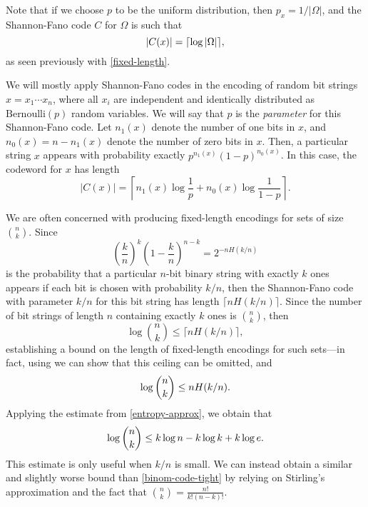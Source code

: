 Note that if we choose $p$ to be the uniform distribution, then
$p_x = 1/|\Omega|$, and the Shannon-Fano code $C$ for $\Omega$ is such
that
\[
|C(x)| = {\lceil \log |\Omega| \rceil},
\]
as seen previously with \eqref{fixed-length}.

We will mostly apply Shannon-Fano codes in the encoding of random bit
strings $x = x_1 \cdots x_n$, where all $x_i$ are independent and
identically distributed as $\text{Bernoulli}(p)$ random variables. We
will say that $p$ is the \emph{parameter} for this Shannon-Fano
code. Let $n_1(x)$ denote the number of one bits in $x$, and $n_0(x) =
n - n_1(x)$ denote the number of zero bits in $x$. Then, a particular
string $x$ appears with probability exactly $p^{n_1(x)} (1 -
p)^{n_0(x)}$. In this case, the codeword for $x$ has length
\[|C(x)| = \left\lceil n_1(x) \log \frac{1}{p} + n_0(x) \log
  \frac{1}{1 - p} \right\rceil.\]

\begin{exm}
  We are often concerned with producing fixed-length encodings for
  sets of size ${n \choose k}$. Since
  \[
  \left(\frac{k}{n}\right)^k \left(1 - \frac{k}{n}\right)^{n - k} =
  2^{-n H(k/n)}
  \]
  is the probability that a particular $n$-bit binary string with
  exactly $k$ ones appears if each bit is chosen with probability
  $k/n$, then the Shannon-Fano code with parameter $k/n$ for this bit
  string has length $\lceil n H(k/n) \rceil$. Since the number of bit
  strings of length $n$ containing exactly $k$ ones is $\binom{n}{k}$,
  then
  \[
  \log \binom{n}{k} \leq \lceil n H(k/n) \rceil,
  \]
  establishing a bound on the length of fixed-length encodings for
  such sets---in fact, using  we can show that
  this ceiling can be omitted, and
  \begin{align}
    \log \binom{n}{k} \leq n H(k/n). \eqlabel{binom-code-tight}
  \end{align}
  Applying the estimate from \eqref{entropy-approx}, we obtain that
  \begin{align}
    \log {n \choose k} \leq k \log n - k \log k + k \log e. \eqlabel{binom-code-loose}
  \end{align}
  This estimate is only useful when $k/n$ is small.  We can instead
  obtain a similar and slightly worse bound than
  \eqref{binom-code-tight} by relying on Stirling's approximation and
  the fact that $\binom{n}{k} = \frac{n!}{k!(n - k)!}$.
\end{exm}

